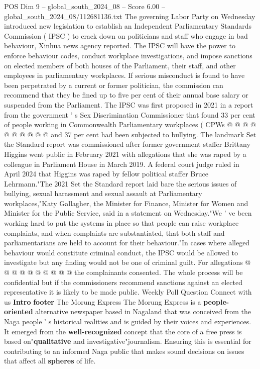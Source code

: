 \begin{textsample}{POS Dim 9 – global\_south\_2024\_08 – Score 6.00 – global\_south\_2024\_08/112681136.txt}
The governing Labor Party on Wednesday introduced new legislation to establish an Independent Parliamentary Standards Commission ( IPSC ) to crack down on politicians and staff who engage in bad behaviour, Xinhua news agency reported.
The IPSC will have the power to enforce behaviour codes, conduct workplace investigations, and impose sanctions on elected members of both houses of the Parliament, their staff, and other employees in parliamentary workplaces.
If serious misconduct is found to have been perpetrated by a current or former politician, the commission can recommend that they be fined up to five per cent of their annual base salary or suspended from the Parliament.
The IPSC was first proposed in 2021 in a report from the government ' s Sex Discrimination Commissioner that found 33 per cent of people working in Commonwealth Parliamentary workplaces ( CPWs @ @ @ @ @ @ @ @ @ @ and 37 per cent had been subjected to bullying.
The landmark Set the Standard report was commissioned after former government staffer Brittany Higgins went public in February 2021 with allegations that she was raped by a colleague in Parliament House in March 2019.
A federal court judge ruled in April 2024 that Higgins was raped by fellow political staffer Bruce Lehrmann."The 2021 Set the Standard report laid bare the serious issues of bullying, sexual harassment and sexual assault at Parliamentary workplaces,"Katy Gallagher, the Minister for Finance, Minister for Women and Minister for the Public Service, said in a statement on Wednesday."We ' ve been working hard to put the systems in place so that people can raise workplace complaints, and when complaints are substantiated, that both staff and parliamentarians are held to account for their behaviour."In cases where alleged behaviour would constitute criminal conduct, the IPSC would be allowed to investigate but any finding would not be one of criminal guilt.
For allegations @ @ @ @ @ @ @ @ @ @ the complainants consented.
The whole process will be confidential but if the commissioners recommend sanctions against an elected representative it is likely to be made public.
Weekly Poll Question Connect with us \textbf{Intro} \textbf{footer} The Morung Express The Morung Express is a \textbf{people-oriented} alternative newspaper based in Nagaland that was conceived from the Naga people ' s historical realities and is guided by their voices and experiences.
It emerged from the \textbf{well-recognized} concept that the core of a free press is based on"\textbf{qualitative} and investigative"journalism.
Ensuring this is essential for contributing to an informed Naga public that makes sound decisions on issues that affect all \textbf{spheres} of life.

\end{textsample}
